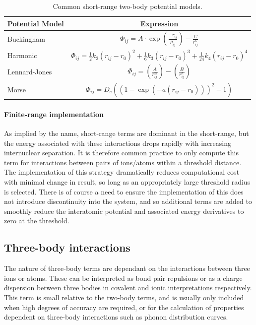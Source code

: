 \begin{table}[t]
  \centering
  \caption{Common short-range two-body potential models.\cite{Gale2003}}
  \label{tab:potentialmodels}
  \begin{tabular}{@{}lc@{}}
  \toprule
  Potential Model         & Expression     \\
  \midrule
  Buckingham              & $\displaystyle{\Phi_{ij} = A\cdot \exp \left(\frac{-r_{ij}}{\rho_{ij}} \right) - \frac{C}{r_{ij}^6}}$    \\
  \addlinespace
  Harmonic                & $\displaystyle{\Phi_{ij} = \frac{1}{2}k_2(r_{ij}-r_0)^2   + \frac{1}{6}k_3(r_{ij}-r_0)^3    + \frac{1}{24}k_4(r_{ij}-r_0)^4   }$    \\
  \addlinespace
  Lennard-Jones           & $\displaystyle{\Phi_{ij} = \left(\frac{A}{r_{ij}^m} \right) - \left( \frac{B}{r_{ij}^n}\right)}$   \\
  \addlinespace
  Morse                   & $\displaystyle{\Phi_{ij} = D_e \left((1- \exp(-a(r_{ij} - r_0)))^2           -1\right) }$    \\
  \bottomrule
  \end{tabular}
\end{table}

\vspace{-5pt}
\paragraph{Finite-range implementation}

As implied by the name, short-range terms are dominant in the short-range, but the energy associated with these interactions drops rapidly with increasing internuclear separation.
It is therefore common practice to only compute this term for interactions between pairs of ions/atoms within a threshold distance.
The implementation of this strategy dramatically reduces computational cost with minimal change in result, so long as an appropriately large threshold radius is selected.
There is of course a need to ensure the implementation of this does not introduce discontinuity into the system, and so additional terms are added to smoothly reduce the interatomic potential and associated energy derivatives to zero at the threshold.


\subsection{Three-body interactions}
The nature of three-body terms are dependant on the interactions between three ions or atoms.
These can be interpreted as bond pair repulsions or as a charge dispersion between three bodies in covalent and ionic interpretations respectively.
This term is small relative to the two-body terms, and is usually only included when high degrees of accuracy are required, or for the calculation of properties dependent on three-body interactions such as phonon distribution curves.

